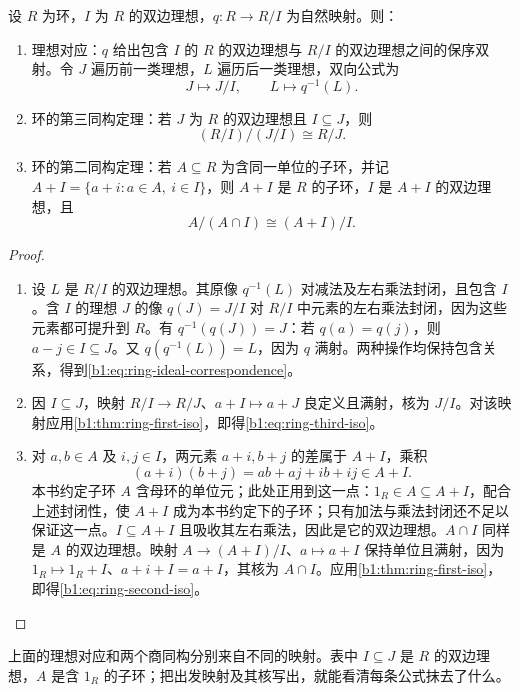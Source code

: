 \begin{proposition}[理想对应与商的同构]\label{b1:prop:ring-ideal-correspondence}
	设 \(R\) 为环，\(I\) 为 \(R\) 的双边理想，\(q:R\rightarrow R/I\) 为自然映射。则：
	\begin{enumerate}
		\item 理想对应：\(q\) 给出包含 \(I\) 的 \(R\) 的双边理想与 \(R/I\) 的双边理想之间的保序双射。令 \(J\) 遍历前一类理想，\(L\) 遍历后一类理想，双向公式为
			\begin{equation}\label{b1:eq:ring-ideal-correspondence}
				J\longmapsto J/I,\qquad L\longmapsto q^{-1}(L).
			\end{equation}
		\item 环的第三同构定理：若 \(J\) 为 \(R\) 的双边理想且 \(I\subseteq J\)，则
			\begin{equation}\label{b1:eq:ring-third-iso}
				(R/I)/(J/I)\cong R/J.
			\end{equation}
		\item 环的第二同构定理：若 \(A\subseteq R\) 为含同一单位的子环，并记 \(A+I=\{a+i:a\in A,\ i\in I\}\)，则 \(A+I\) 是 \(R\) 的子环，\(I\) 是 \(A+I\) 的双边理想，且
			\begin{equation}\label{b1:eq:ring-second-iso}
				A/(A\cap I)\cong(A+I)/I.
			\end{equation}
	\end{enumerate}
\end{proposition}
\begin{proof}
	\begin{enumerate}
		\item 设 \(L\) 是 \(R/I\) 的双边理想。其原像 \(q^{-1}(L)\) 对减法及左右乘法封闭，且包含 \(I\)。含 \(I\) 的理想 \(J\) 的像 \(q(J)=J/I\) 对 \(R/I\) 中元素的左右乘法封闭，因为这些元素都可提升到 \(R\)。有 \(q^{-1}(q(J))=J\)：若 \(q(a)=q(j)\)，则 \(a-j\in I\subseteq J\)。又 \(q(q^{-1}(L))=L\)，因为 \(q\) 满射。两种操作均保持包含关系，得到\cref{b1:eq:ring-ideal-correspondence}。
		\item 因 \(I\subseteq J\)，映射 \(R/I\rightarrow R/J\)、\(a+I\mapsto a+J\) 良定义且满射，核为 \(J/I\)。对该映射应用\cref{b1:thm:ring-first-iso}，即得\cref{b1:eq:ring-third-iso}。
		\item 对 \(a,b\in A\) 及 \(i,j\in I\)，两元素 \(a+i,b+j\) 的差属于 \(A+I\)，乘积
			\[
				(a+i)(b+j)=ab+aj+ib+ij\in A+I.
			\]
			本书约定子环 \(A\) 含母环的单位元；此处正用到这一点：\(1_R\in A\subseteq A+I\)，配合上述封闭性，使 \(A+I\) 成为本书约定下的子环；只有加法与乘法封闭还不足以保证这一点。\(I\subseteq A+I\) 且吸收其左右乘法，因此是它的双边理想。\(A\cap I\) 同样是 \(A\) 的双边理想。映射 \(A\rightarrow(A+I)/I\)、\(a\mapsto a+I\) 保持单位且满射，因为 \(1_R\mapsto1_R+I\)、\(a+i+I=a+I\)，其核为 \(A\cap I\)。应用\cref{b1:thm:ring-first-iso}，即得\cref{b1:eq:ring-second-iso}。
	\end{enumerate}
\end{proof}
上面的理想对应和两个商同构分别来自不同的映射。表中 \(I\subseteq J\) 是 \(R\) 的双边理想，\(A\) 是含 \(1_R\) 的子环；把出发映射及其核写出，就能看清每条公式抹去了什么。

